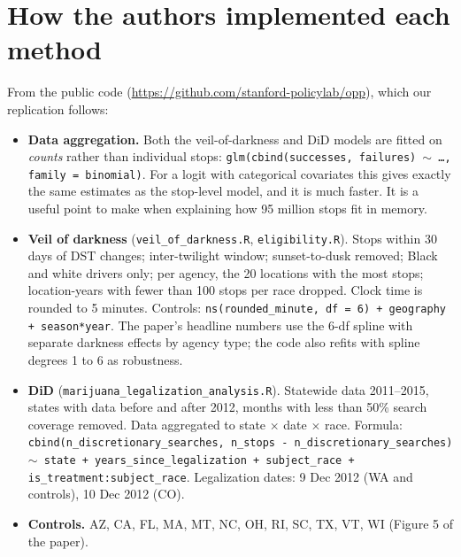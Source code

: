 \documentclass[11pt]{article}
\newcommand{\1}{\mathbf{1}}
\begin{document}
\section{How the authors implemented each method}
\label{sec:code}
From the public code (\url{https://github.com/stanford-policylab/opp}), which our replication follows:
\begin{itemize}
  \item \textbf{Data aggregation.} Both the veil-of-darkness and DiD models are fitted on \emph{counts} rather than individual stops: \texttt{glm(cbind(successes, failures) $\sim$ \ldots, family = binomial)}. For a logit with categorical covariates this gives exactly the same estimates as the stop-level model, and it is much faster. It is a useful point to make when explaining how 95 million stops fit in memory.
  \item \textbf{Veil of darkness} (\texttt{veil\_of\_darkness.R}, \texttt{eligibility.R}). Stops within 30 days of DST changes; inter-twilight window; sunset-to-dusk removed; Black and white drivers only; per agency, the 20 locations with the most stops; location-years with fewer than 100 stops per race dropped. Clock time is rounded to 5 minutes. Controls: \texttt{ns(rounded\_minute, df = 6) + geography + season*year}. The paper's headline numbers use the 6-df spline with separate darkness effects by agency type; the code also refits with spline degrees 1 to 6 as robustness.
  \item \textbf{DiD} (\texttt{marijuana\_legalization\_analysis.R}). Statewide data 2011--2015, states with data before and after 2012, months with less than 50\% search coverage removed. Data aggregated to state $\times$ date $\times$ race. Formula: \texttt{cbind(n\_discretionary\_searches, n\_stops - n\_discretionary\_searches) $\sim$ state + years\_since\_legalization + subject\_race + is\_treatment:subject\_race}. Legalization dates: 9 Dec 2012 (WA and controls), 10 Dec 2012 (CO).
  \item \textbf{Controls.} AZ, CA, FL, MA, MT, NC, OH, RI, SC, TX, VT, WI (Figure 5 of the paper).
\end{itemize}
\end{document}
